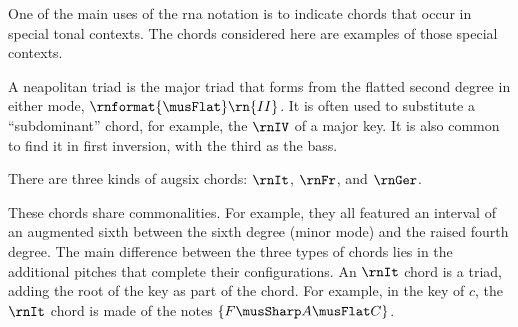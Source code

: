 
One of the main uses of the \gls{rna} notation is to
indicate chords that occur in special tonal contexts. The
chords considered here are examples of those special
contexts.


A \gls{neapolitan} triad is the major triad that forms from
the flatted second degree in either mode,
$\rnformat{\musFlat}\rn{II}$. It is often used to substitute
a ``subdominant'' chord, for example, the $\rnIV$ of a major
key. It is also common to find it in first inversion, with
the third as the bass.


There are three kinds of \gls{augsix} chords: $\rnIt$,
$\rnFr$, and $\rnGer$.

These chords share commonalities. For example, they all
featured an interval of an augmented sixth between the sixth
degree (minor mode) and the raised fourth degree. The main
difference between the three types of chords lies in the
additional pitches that complete their configurations. An
$\rnIt$ chord is a triad, adding the root of the key as part
of the chord. For example, in the key of $c$, the $\rnIt$
chord is made of the notes $\{F\musSharp A\musFlat C\}$.
